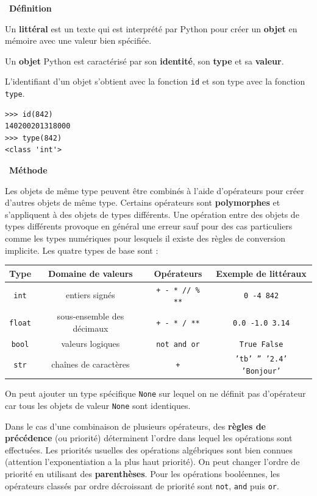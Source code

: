 \documentclass[a4paper, french, 12pt]{article}  %
\newcounter{def}
\newenvironment{definition}[1]
{\par \medskip   \addtocounter{def}{1} \noindent  
\begin{bclogo}[arrondi =0.1,  ombre = true, barre=none, logo=\bcbook, marge=4]{~\textbf{Définition} \textbf{\thedef} {\itshape #1} }  \par}
{
\end{bclogo}
 \par \bigskip }
\newcounter{alg}
\newcounter{logi}
\newenvironment{methode}[1]
{\par \medskip    \noindent  
 \begin {bclogo}[arrondi =0.1,logo=\bcoutil, marge=4,noborder = true] {~\textbf{Méthode}   {\itshape #1} }  \par}
{
\end{bclogo}
 \par \bigskip }
\begin{document}
\begin{definition}{}
Un \textbf{littéral} est un texte qui est interprété par Python pour créer un \textbf{objet} en mémoire avec  une valeur bien spécifiée.

Un \textbf{objet} Python est caractérisé par son \textbf{identité}, son  \textbf{type} et sa \textbf{valeur}.

L'identifiant d'un objet s'obtient avec la fonction \texttt{id} et son type avec la fonction \texttt{type}.

\begin{lstlisting}[style=compil]
>>> id(842)
140200201318000
>>> type(842)
<class 'int'>
\end{lstlisting}

\end{definition}


\begin{methode}{}

Les objets de même type peuvent être combinés à l'aide d'opérateurs pour créer d'autres objets de même type. Certains opérateurs sont \textbf{polymorphes} et s'appliquent à des objets de types différents. Une opération entre des objets de types différents provoque  en général une erreur sauf pour des cas particuliers comme les types numériques pour lesquels il existe des règles de conversion implicite. Les quatre types de base sont :

\begin{tabular}{|c|c|c|c|}
\hline 
Type & Domaine de valeurs & Opérateurs & Exemple de littéraux \\ 
\hline 
\texttt{int} & entiers signés & \texttt{+  - * //   \%  **} & \texttt{0   -4   842} \\ 
\hline 
\texttt{float} & sous-ensemble des décimaux  & \texttt{+  - * /  **} & \texttt{0.0 -1.0 3.14} \\ 
\hline 
\texttt{bool} & valeurs logiques  & \texttt{not and or} & \texttt{True False} \\ 
\hline 
\texttt{str} & chaînes de caractères  & \texttt{+} & \texttt{'tb' ''  '2.4' 'Bonjour'} \\
\hline 
\end{tabular} 

On peut ajouter un type spécifique \texttt{None} sur lequel on ne définit pas d'opérateur car tous les objets de valeur \texttt{None} sont identiques.

\bcattention{} Dans le cas d'une combinaison de plusieurs opérateurs, des \textbf{règles de précédence} (ou priorité) déterminent l'ordre dans lequel les opérations sont effectuées. Les priorités usuelles des opérations algébriques sont bien connues (attention l'exponentiation a la plus haut priorité). On peut changer l'ordre de priorité en utilisant des \textbf{parenthèses}.  Pour les  opérations booléennes, les opérateurs classés par ordre décroissant de priorité sont  \texttt{not},  \texttt{and}  puis \texttt{or}.   


\end{methode}
\end{document}
